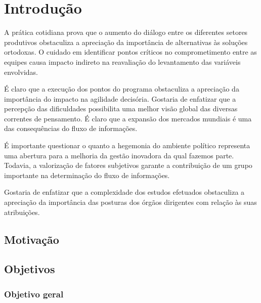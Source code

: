 \documentclass[
	12pt,				%
	oneside,			%
	a4paper,			%
	english,			%
	french,				%
	spanish,			%
	brazil				%
	]{abntex2}
\begin{document}
\textual
\pagestyle{simple}                  %


\hypertarget{introduuxe7uxe3o}{%
\chapter{Introdução}\label{introduuxe7uxe3o}}

A prática cotidiana prova que o aumento do diálogo entre os diferentes
setores produtivos obstaculiza a apreciação da importância de
alternativas às soluções ortodoxas. O cuidado em identificar pontos
críticos no comprometimento entre as equipes causa impacto indireto na
reavaliação do levantamento das variáveis envolvidas.

É claro que a execução dos pontos do programa obstaculiza a apreciação
da importância do impacto na agilidade decisória. Gostaria de enfatizar
que a percepção das dificuldades possibilita uma melhor visão global das
diversas correntes de pensamento. É claro que a expansão dos mercados
mundiais é uma das consequências do fluxo de informações.

É importante questionar o quanto a hegemonia do ambiente político
representa uma abertura para a melhoria da gestão inovadora da qual
fazemos parte. Todavia, a valorização de fatores subjetivos garante a
contribuição de um grupo importante na determinação do fluxo de
informações.

Gostaria de enfatizar que a complexidade dos estudos efetuados
obstaculiza a apreciação da importância das posturas dos órgãos
dirigentes com relação às suas atribuições.

\hypertarget{motivauxe7uxe3o}{%
\section{Motivação}\label{motivauxe7uxe3o}}

\hypertarget{objetivos}{%
\section{Objetivos}\label{objetivos}}

\hypertarget{objetivo-geral}{%
\subsection{Objetivo geral}\label{objetivo-geral}}
\end{document}
